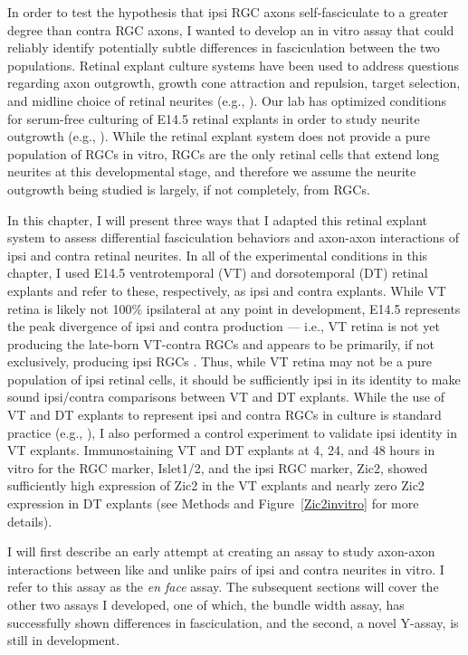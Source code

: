 In order to test the hypothesis that ipsi RGC axons self-fasciculate to a greater degree than contra RGC axons, I wanted to develop an in vitro assay that could reliably identify potentially subtle differences in fasciculation between the two populations.
Retinal explant culture systems have been used to address questions regarding axon outgrowth, growth cone attraction and repulsion, target selection, and midline choice of retinal neurites (e.g., ).
Our lab has optimized conditions for serum-free culturing of E14.5 retinal explants in order to study neurite outgrowth (e.g., ).
While the retinal explant system does not provide a pure population of RGCs in vitro, RGCs are the only retinal cells that extend long neurites at this developmental stage, and therefore we assume the neurite outgrowth being studied is largely, if not completely, from RGCs.

In this chapter, I will present three ways that I adapted this retinal explant system to assess differential fasciculation behaviors and axon-axon interactions of ipsi and contra retinal neurites.
In all of the experimental conditions in this chapter, I used E14.5 ventrotemporal (VT) and dorsotemporal (DT) retinal explants and refer to these, respectively, as ipsi and contra explants.
While VT retina is likely not 100\% ipsilateral at any point in development, E14.5 represents the peak divergence of ipsi and contra production --- i.e., VT retina is not yet producing the late-born VT-contra RGCs and appears to be primarily, if not exclusively, producing ipsi RGCs \cite{drager1985birth}.
Thus, while VT retina may not be a pure population of ipsi retinal cells, it should be sufficiently ipsi in its identity to make sound ipsi/contra comparisons between VT and DT explants.
While the use of VT and DT explants to represent ipsi and contra RGCs in culture is standard practice (e.g., ), I also performed a control experiment to validate ipsi identity in VT explants.
Immunostaining VT and DT explants at 4, 24, and 48 hours in vitro for the RGC marker, Islet1/2, and the ipsi RGC marker, Zic2, showed sufficiently high expression of Zic2 in the VT explants and nearly zero Zic2 expression in DT explants (see Methods and Figure~\ref{Zic2invitro} for more details).

I will first describe an early attempt at creating an assay to study axon-axon interactions between like and unlike pairs of ipsi and contra neurites in vitro.
I refer to this assay as the \emph{en face} assay.
The subsequent sections will cover the other two assays I developed, one of which, the bundle width assay, has successfully shown differences in fasciculation, and the second, a novel Y-assay, is still in development.
